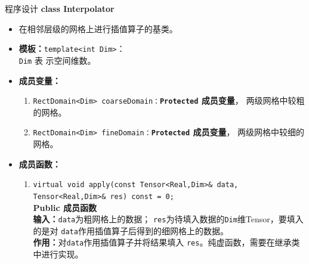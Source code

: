 \documentclass{beamer}
\begin{document}
\begin{frame}{程序设计}
\textbf{\large class Interpolator}
\begin{itemize}
    \item 在相邻层级的网格上进行插值算子的基类。
    \item \textbf{模板：}\texttt{template<int Dim>}：\\\texttt{Dim} 表
      示空间维数。
       \item \textbf{成员变量：}
        \begin{enumerate}[(1)]
            \item \texttt{RectDomain<Dim>
                coarseDomain：}\textbf{\texttt{Protected}  成员变量}，
              两级网格中较粗的网格。
              \item \texttt{RectDomain<Dim>
                fineDomain：}\textbf{\texttt{Protected}  成员变量}，
              两级网格中较细的网格。
        \end{enumerate}
    \item \textbf{成员函数：}
            \begin{enumerate}[(1)]
                               \item \texttt{virtual void apply(const Tensor<Real,Dim>\& data,
                    Tensor<Real,Dim>\& res) const = 0;}\\
                  \textbf{Public 成员函数}\\
                \textbf{输入：}\texttt{data}为粗网格上的数据；
                \texttt{res}为待填入数据的\texttt{Dim}维Tensor，要填入的是对
                \texttt{data}作用插值算子后得到的细网格上的数据。\\
                \textbf{作用：}对\texttt{data}作用插值算子并将结果填入
                \texttt{res}。纯虚函数，需要在继承类中进行实现。
            \end{enumerate}
          \end{itemize}


\end{frame}
\end{document}
